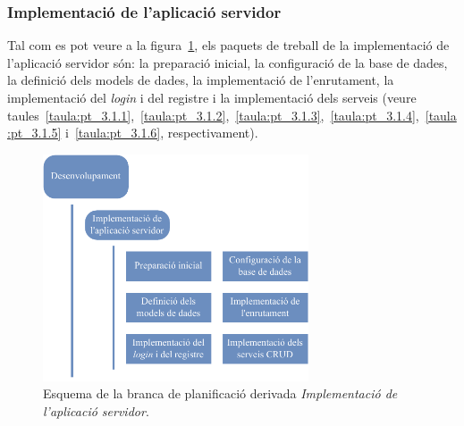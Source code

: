 \documentclass[a4paper,12pt]{ThesisStyle}
\begin{document}
\newpage

\subsubsection{Implementació de l'aplicació servidor}
\label{subsubsec:implementacio_api}

Tal com es pot veure a la figura~\ref{img:pt_implementacio_api}, els paquets de treball de la implementació de l'aplicació servidor són: la preparació inicial, la configuració de la base de dades, la definició dels models de dades, la implementació de l'enrutament, la implementació del \textit{login} i del registre i la implementació dels serveis (veure taules~\ref{taula:pt_3.1.1},~\ref{taula:pt_3.1.2},~\ref{taula:pt_3.1.3},~\ref{taula:pt_3.1.4},~\ref{taula:pt_3.1.5} i~\ref{taula:pt_3.1.6}, respectivament).

\begin{figure}[H]
	\centering
	\includegraphics[width=0.7\textwidth]{assets/working_packages/desenvolupament/implementacioAPI.pdf}
	\caption{\label{img:pt_implementacio_api}Esquema de la branca de planificació derivada \emph{Implementació de l'aplicació servidor}.}
\end{figure}

\newpage
\end{document}
